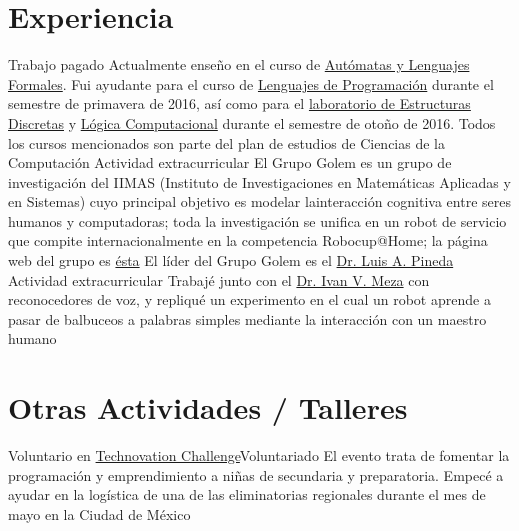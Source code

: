 \documentclass[11pt,a4paper,sans]{moderncv} %
\begin{document}
\section{Experiencia}
        {Trabajo pagado}
        {Actualmente enseño en el curso de \href{https://sites.google.com/site/automataslengformales20172/}{Autómatas y Lenguajes Formales}. Fui ayudante para el curso de \href{https://sites.google.com/site/lengprog20162/}{Lenguajes de Programación} durante el semestre de primavera de 2016, así como para el \href{https://sites.google.com/a/ciencias.unam.mx/estructuras-discretas/home}{laboratorio de Estructuras Discretas} y \href{https://sites.google.com/site/logcompunam20171/home}{Lógica Computacional} durante el semestre de otoño de 2016. Todos los cursos mencionados son parte del plan de estudios de Ciencias de la Computación}
        {}{}{}
        {Actividad extracurricular}
        {El Grupo Golem es un grupo de investigación del IIMAS (Instituto de Investigaciones en Matem\'{a}ticas Aplicadas y en Sistemas) cuyo principal objetivo es modelar lainteracción cognitiva entre seres humanos y computadoras; toda la investigación se unifica en un robot de servicio que compite internacionalmente en la competencia Robocup@Home; la página web del grupo es \href{http://golem.iimas.unam.mx/home.php?lang=en&sec=home}{ésta}}
        {El líder del Grupo Golem es el \href{http://turing.iimas.unam.mx/~luis/}{Dr. Luis A. Pineda}}{}{}
        {Actividad extracurricular}
        {Trabajé junto con el \href{http://turing.iimas.unam.mx/~ivanvladimir/}{Dr. Ivan V. Meza} con reconocedores de voz, y repliqué un experimento en el cual un robot aprende a pasar de balbuceos a palabras simples mediante la interacción con un maestro humano}
        {}{}{}

\section{Otras Actividades / Talleres}

        {Voluntario en \href{http://technovationmx.org}{Technovation Challenge}}{Voluntariado}
        {El evento trata de fomentar la programación y emprendimiento a niñas de secundaria y preparatoria. Empecé a ayudar en la logística de una de las eliminatorias regionales durante el mes de mayo en la Ciudad de México}
        {}{}
\end{document}
